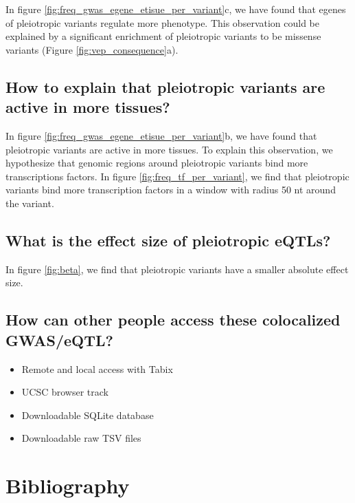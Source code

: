 In figure \ref{fig:freq_gwas_egene_etisue_per_variant}c, we have found that egenes of pleiotropic variants regulate more phenotype.
This observation could be explained by a significant enrichment of pleiotropic variants to be missense variants (Figure \ref{fig:vep_consequence}a).

\subsection*{How to explain that pleiotropic variants are active in more tissues?}

In figure \ref{fig:freq_gwas_egene_etisue_per_variant}b, we have found that pleiotropic variants are active in more tissues.
To explain this observation, we hypothesize that genomic regions around pleiotropic variants bind more transcriptions factors.
In figure \ref{fig:freq_tf_per_variant}, we find that pleiotropic variants bind more transcription factors in a window with radius 50 nt around the variant.

\subsection*{What is the effect size of pleiotropic eQTLs?}

In figure \ref{fig:beta}, we find that pleiotropic variants have a smaller absolute effect size.

\subsection*{How can other people access these colocalized GWAS/eQTL?}

\begin{itemize}
  \item Remote and local access with Tabix
  \item UCSC browser track
  \item Downloadable SQLite database
  \item Downloadable raw TSV files
\end{itemize}

\section*{Bibliography}


